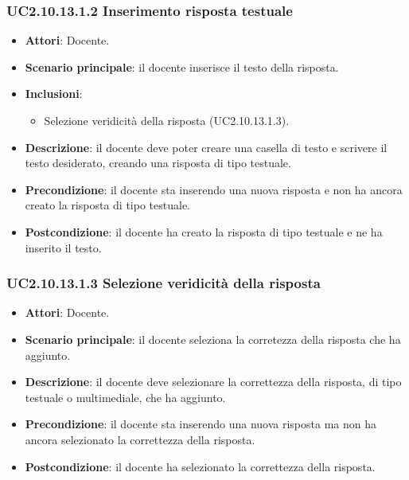 \subsubsection{UC2.10.13.1.2 Inserimento risposta testuale}
\begin{itemize}
\item \textbf{Attori}: Docente.
\item \textbf{Scenario principale}: il docente inserisce il testo della risposta.
\item \textbf{Inclusioni}:
\begin{itemize}
\item Selezione veridicità della risposta (UC2.10.13.1.3).
\end{itemize}
\item \textbf{Descrizione}: il docente deve poter creare una casella di testo e scrivere il testo desiderato, creando una risposta di tipo testuale.
\item \textbf{Precondizione}: il docente sta inserendo una nuova risposta e non ha ancora creato la risposta di tipo testuale.
\item \textbf{Postcondizione}: il docente ha creato la risposta di tipo testuale e ne ha inserito il testo.
\end{itemize}
\subsubsection{UC2.10.13.1.3 Selezione veridicità della risposta}
\begin{itemize}
\item \textbf{Attori}: Docente.
\item \textbf{Scenario principale}: il docente seleziona la corretezza della risposta che ha aggiunto.
\item \textbf{Descrizione}: il docente deve selezionare la correttezza della risposta, di tipo testuale o multimediale, che ha aggiunto.
\item \textbf{Precondizione}: il docente sta inserendo una nuova risposta ma non ha ancora selezionato la correttezza della risposta.
\item \textbf{Postcondizione}: il docente ha selezionato la correttezza della risposta.
\end{itemize}
